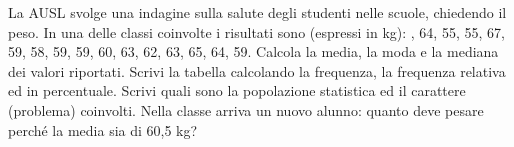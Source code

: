\item La AUSL svolge una indagine sulla salute degli studenti nelle scuole, chiedendo il peso. In una delle classi coinvolte i risultati sono (espressi in kg): , 64, 55, 55, 67, 59, 58, 59, 59, 60, 63, 62, 63, 65, 64, 59.
				Calcola la media, la moda e la mediana dei valori riportati. \newline
				Scrivi la tabella calcolando la frequenza, la frequenza relativa ed in percentuale.\newline
				Scrivi quali sono la popolazione statistica ed il carattere (problema) coinvolti. \newline
				Nella classe arriva un nuovo alunno: quanto deve pesare perché la media sia di 60,5 kg? 